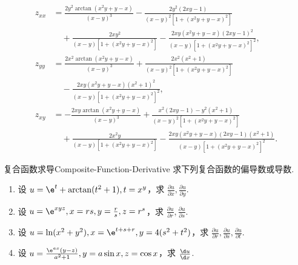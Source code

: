 \begin{solution}
\begin{equation}
{\begin{aligned}
                z_{xx} & = \frac{2y^2 \arctan(x^2y+y-x)}{(x-y)^3} - \frac{2y^2(2xy-1)}{(x-y)^2[1+(x^2y+y-x)^2]}                      \\
                       & \quad + \frac{2xy^2}{(x-y)[1+(x^2y+y-x)^2]} - \frac{2xy(x^2y+y-x)(2xy-1)^2}{(x-y)[1+(x^2y+y-x)^2]^2},       \\
                z_{yy} & = \frac{2x^2 \arctan(x^2y+y-x)}{(x-y)^3} + \frac{2x^2(x^2+1)}{(x-y)^2[1+(x^2y+y-x)^2]}                      \\
                       & \quad - \frac{2xy(x^2y+y-x)(x^2+1)^2}{(x-y)[1+(x^2y+y-x)^2]^2},                                             \\
                z_{xy} & = -\frac{2xy \arctan(x^2y+y-x)}{(x-y)^3} + \frac{x^2(2xy-1)-y^2(x^2+1)}{(x-y)^2[1+(x^2y+y-x)^2]}            \\
                       & \quad + \frac{2x^2 y}{(x-y)[1+(x^2y+y-x)^2]} - \frac{2xy(x^2y+y-x)(2xy-1)(x^2+1)}{(x-y)[1+(x^2y+y-x)^2]^2}.
            \end{aligned}
        }
    \end{equation}
\end{solution}


\begin{problem}{复合函数求导}{Composite-Function-Derivative}
    求下列复合函数的偏导数或导数.
    \begin{enumerate}
        \item 设 $u = \e^t + \arctan(t^2 + 1), t = x^y$，求 $\frac{\partial u}{\partial x}, \frac{\partial u}{\partial y}$.
        \item 设 $u = \e^{xyz}, x = rs, y = \frac{r}{s}, z = r^s$，求 $\frac{\partial u}{\partial r}, \frac{\partial u}{\partial s}$.
        \item 设 $u = \ln(x^2 + y^2), x = \e^{t+s+r}, y = 4(s^2 + t^2)$，求 $\frac{\partial u}{\partial r}, \frac{\partial u}{\partial s}, \frac{\partial u}{\partial t}$.
        \item 设 $u = \frac{\e^{ax}(y-z)}{a^2+1}, y = a \sin x, z = \cos x$，求 $\frac{\d u}{\d x}$.
    \end{enumerate}
\end{problem}

